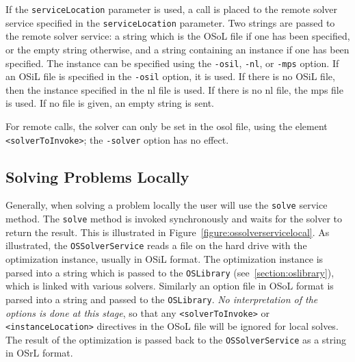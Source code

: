 \documentclass[11pt]{article}
\newcounter{Fig}
\renewcommand{\_}{{\char"5F}}
\renewcommand{\{}{{\char"7B}}
\renewcommand{\}}{{\char"7D}}
\renewcommand{\^}{{\char"0D}}
\renewcommand{\'}{{\char"0D}}
\begin{document}
\begin{enumerate}[Step 1:]
\medskip

If the {\tt serviceLocation} parameter is used, a call is placed to the remote solver service
specified in the {\tt serviceLocation} parameter. 
Two strings are passed to the remote solver service: a string which is the OSoL file 
if one has been specified, or the empty string otherwise, and a string containing an 
instance if one has been specified. The instance can be specified using the {\tt -osil}, {\tt -nl}, or 
{\tt -mps} option. If an OSiL file is specified in the {\tt -osil} option, it is used. If there is no 
OSiL file, then the instance specified in the nl file is used. If there is no nl file,  
the mps file is used. If no file is given, an empty string is sent.

For remote calls, the solver can only be set in the osol file, using the element {\tt <solverToInvoke>};
the {\tt -solver} option has no effect.



\subsection{Solving Problems Locally}

Generally, when solving a problem locally the user will use the {\tt solve} service 
method. The {\tt solve} method is invoked synchronously and waits for the solver to return the result.  
This is illustrated in Figure~\ref{figure:ossolverservicelocal}. As illustrated, the {\tt OSSolverService} 
reads a file on the hard drive with the optimization instance, usually in OSiL format. 
The optimization instance is parsed into a string which is passed to the {\tt OSLibrary} 
(see~\ref{section:oslibrary}), which is linked with various solvers. 
Similarly an option file in OSoL format is parsed into a string and passed to the {\tt OSLibrary}. 
{\it No interpretation of the options is done at this stage}, so that any {\tt <solverToInvoke>} or
{\tt <instanceLocation>} directives in the OSoL file will be ignored for local solves.
The result of the optimization is passed back to the {\tt OSSolverService} as a string in OSrL format.




\end{enumerate}
\end{document}

